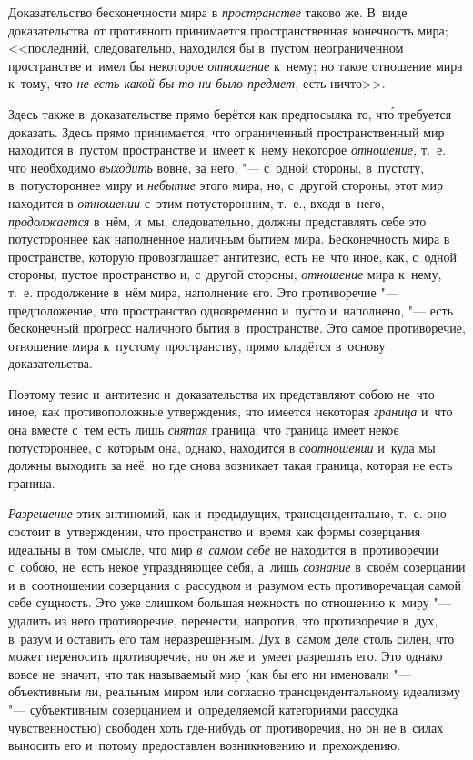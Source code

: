 Доказательство бесконечности мира в {\em пространстве} таково же. В~виде
доказательства от противного принимается пространственная конечность мира;
<<последний, следовательно, находился бы в~пустом неограниченном пространстве
и~имел бы некоторое {\em отношение} к~нему; но такое отношение мира к~тому, что
{\em не есть какой бы то ни было предмет,} есть ничто>>.

Здесь также в~доказательстве прямо берётся как предпосылка то, чт\'{о} требуется
доказать. Здесь прямо принимается, что ограниченный пространственный мир
находится в~пустом пространстве и~имеет к~нему некоторое {\em отношение,} т.~е.
что необходимо {\em выходить} вовне, за него, "--- с~одной стороны, в~пустоту,
в~потустороннее миру и {\em небытие} этого мира, но, с~другой стороны, этот мир
находится в {\em отношении} с~этим потусторонним, т.~е., входя в~него,
{\em продолжается} в~нём, и~мы, следовательно, должны представлять себе это
потустороннее как наполненное наличным бытием мира. Бесконечность мира в
пространстве, которую провозглашает антитезис, есть не~что иное, как, с~одной
стороны, пустое пространство и, с~другой стороны, {\em отношение} мира к~нему,
т.~е. продолжение в~нём мира, наполнение его. Это противоречие "--- предположение,
что пространство одновременно и~пусто и~наполнено, "--- есть бесконечный прогресс
наличного бытия в~пространстве. Это самое противоречие, отношение мира к~пустому
пространству, прямо кладётся в~основу доказательства.

Поэтому тезис и~антитезис и~доказательства их представляют собою не~что иное,
как противоположные утверждения, что имеется некоторая {\em граница} и~что она
вместе с~тем есть лишь {\em снятая} граница; что граница имеет некое
потустороннее, с~которым она, однако, находится в {\em соотношении} и~куда мы
должны выходить за неё, но где снова возникает такая граница, которая не есть
граница.

{\em Разрешение} этих антиномий, как и~предыдущих, трансцендентально, т.~е. оно
состоит в~утверждении, что пространство и~время как формы созерцания идеальны
в~том смысле, что мир {\em в~самом себе} не находится в~противоречии с~собою,
не~есть некое упраздняющее себя, а~лишь {\em сознание} в~своём созерцании и
в~соотношении созерцания с~рассудком и~разумом есть противоречащая самой себе
сущность. Это уже слишком большая нежность по отношению к~миру "--- удалить из
него противоречие, перенести, напротив, это противоречие в~дух, в~разум и
оставить его там неразрешённым. Дух в~самом деле столь силён, что может
переносить противоречие, но он же и~умеет разрешать его. Это однако вовсе
не~значит, что так называемый мир (как бы его ни именовали "--- объективным ли,
реальным миром или согласно трансцендентальному идеализму "--- субъективным
созерцанием и~определяемой категориями рассудка чувственностью) свободен хоть
где-нибудь от противоречия, но он не в~силах выносить его и~потому предоставлен
возникновению и~прехождению.

